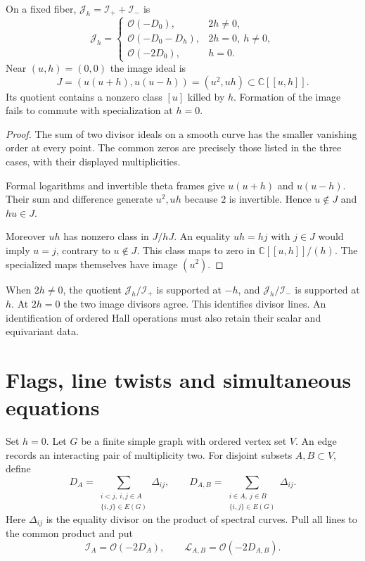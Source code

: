 \begin{proposition}\label{ei:prop:ordered-images}
On a fixed fiber, $\mathcal J_h=\mathcal I_++\mathcal I_-$ is
\[
 \mathcal J_h=
 \begin{cases}
  \mathcal O(-D_0),&2h\ne0,\\
  \mathcal O(-D_0-D_h),&2h=0,\ h\ne0,\\
  \mathcal O(-2D_0),&h=0.
 \end{cases}
\]
Near $(u,h)=(0,0)$ the image ideal is
\begin{equation}\label{ei:eq:sum-ideal}
 J=(u(u+h),u(u-h))=(u^2,uh)\subset\mathbb C[[u,h]].
\end{equation}
Its quotient contains a nonzero class $[u]$ killed by $h$.
Formation of the image fails to commute with specialization at $h=0$.
\end{proposition}

\begin{proof}
The sum of two divisor ideals on a smooth curve has the smaller
vanishing order at every point. The common zeros are precisely those
listed in the three cases, with their displayed multiplicities.

Formal logarithms and invertible theta frames give $u(u+h)$ and
$u(u-h)$. Their sum and difference generate $u^2,uh$ because
$2$ is invertible. Hence $u\notin J$ and $hu\in J$.

Moreover $uh$ has nonzero class in $J/hJ$. An equality $uh=hj$
with $j\in J$ would imply $u=j$, contrary to $u\notin J$.
This class maps to zero in $\mathbb C[[u,h]]/(h)$.
The specialized maps themselves have image $(u^2)$.
\end{proof}

When $2h\ne0$, the quotient $\mathcal J_h/\mathcal I_+$ is supported
at $-h$, and $\mathcal J_h/\mathcal I_-$ is supported at $h$.
At $2h=0$ the two image divisors agree.
This identifies divisor lines. An identification of ordered Hall
operations must also retain their scalar and equivariant data.

\section{Flags, line twists and simultaneous equations}
\label{ei:sec:flags}

Set $h=0$. Let $G$ be a finite simple graph with ordered vertex set $V$.
An edge records an interacting pair of multiplicity two.
For disjoint subsets $A,B\subset V$, define
\[
 D_A=\sum_{\substack{i<j,\ i,j\in A\\\{i,j\}\in E(G)}}\Delta_{ij},
 \qquad
 D_{A,B}=\sum_{\substack{i\in A,\ j\in B\\\{i,j\}\in E(G)}}\Delta_{ij}.
\]
Here $\Delta_{ij}$ is the equality divisor on the product of
spectral curves. Pull all lines to the common product and put
\[
 \mathcal I_A=\mathcal O(-2D_A),\qquad
 \mathcal L_{A,B}=\mathcal O(-2D_{A,B}).
\]


